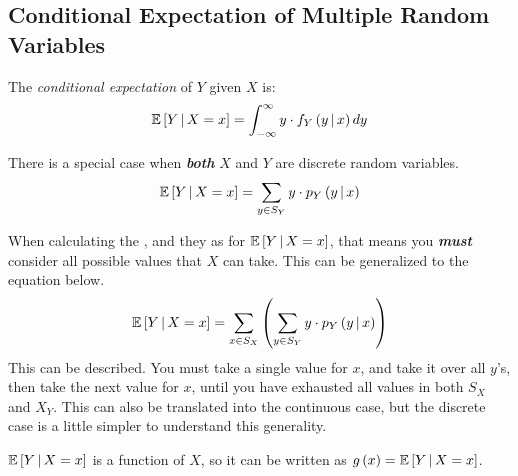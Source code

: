 \subsection{Conditional Expectation of Multiple Random Variables}\label{subsec:Conditional Expectation of Multiple Variables}
\begin{definition}\label{def:Conditional Expectation of Multiple Variables}
  The \emph{conditional expectation} of $Y$ given $X$ is:
  \begin{equation}\label{eq:Conditional Expectation of Multiple Variables}
    \operatorname{\operatorname{\mathbb{E}}} \left[ Y \operatorname{\vert} X=x \right] = \int_{-\infty}^{\infty} y \cdot f_{Y} \left( y \operatorname{\vert} x \right) dy
  \end{equation}
  \begin{remark}
    There is a special case when \emph{\textbf{both}} $X$ and $Y$ are discrete random variables.
    \begin{equation}\label{eq:Conditional Expectation of Multiple Discrete Variables}
      \operatorname{\operatorname{\mathbb{E}}} \left[ Y \operatorname{\vert} X=x \right] = \sum_{y \in S_{Y}} y \cdot p_{Y} \left( y \operatorname{\vert} x \right)
    \end{equation}
  \end{remark}
  \begin{remark}
    When calculating the , and they as for $\operatorname{\operatorname{\mathbb{E}}} \left[ Y \operatorname{\vert} X=x \right]$, that means you \emph{\textbf{must}} consider all possible values that $X$ can take.
    This can be generalized to the equation below.
    \begin{equation}\label{eq:General Conditional Expectation of Multiple Variables}
      \operatorname{\operatorname{\mathbb{E}}} \left[ Y \operatorname{\vert} X=x \right] = \sum_{x \in S_{X}} \left( \sum_{y \in S_{Y}} y \cdot p_{Y} \left( y \operatorname{\vert} x \right) \right)
    \end{equation}
    This can be described. You must take a single value for $x$, and take it over all $y$'s, then take the next value for $x$, until you have exhausted all values in both $S_{X}$ and $X_{Y}$. \newline
    This can also be translated into the continuous case, but the discrete case is a little simpler to understand this generality.
  \end{remark}
  \begin{remark}
    $\operatorname{\operatorname{\mathbb{E}}} \left[ Y \operatorname{\vert} X=x \right]$ is a function of $X$, so it can be written as $g \left( x \right) = \operatorname{\operatorname{\mathbb{E}}} \left[ Y \operatorname{\vert} X=x \right]$.

\end{remark}
\end{definition}
